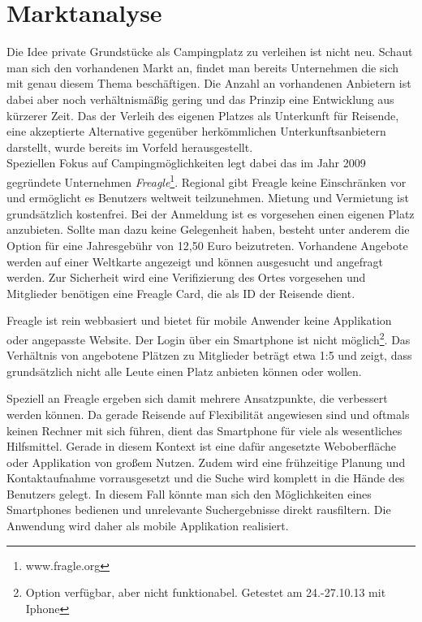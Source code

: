 
\section{Marktanalyse}
    Die Idee private Grundstücke als Campingplatz zu verleihen ist nicht neu. Schaut man sich den vorhandenen Markt an, findet man bereits Unternehmen die sich mit genau diesem Thema beschäftigen. Die Anzahl an vorhandenen Anbietern ist dabei aber noch verhältnismäßig gering und das Prinzip eine Entwicklung aus kürzerer Zeit. Das der Verleih des eigenen Platzes als Unterkunft für Reisende, eine akzeptierte Alternative gegenüber herkömmlichen Unterkunftsanbietern darstellt, wurde bereits im Vorfeld herausgestellt.\\
    Speziellen Fokus auf Campingmöglichkeiten legt dabei das im Jahr 2009 gegründete Unternehmen \textit{Freagle}\footnote{www.fragle.org}. Regional gibt Freagle keine Einschränken vor und ermöglicht es Benutzers weltweit teilzunehmen. Mietung und Vermietung ist grundsätzlich kostenfrei. Bei der Anmeldung ist es vorgesehen einen eigenen Platz anzubieten. Sollte man dazu keine Gelegenheit haben, besteht unter anderem die Option für eine Jahresgebühr von 12,50 Euro beizutreten. Vorhandene Angebote werden auf einer Weltkarte angezeigt und können ausgesucht und angefragt werden. Zur Sicherheit wird eine Verifizierung des Ortes vorgesehen und Mitglieder benötigen eine Freagle Card, die als ID der Reisende dient.

    Freagle ist rein webbasiert und bietet für mobile Anwender keine  Applikation oder angepasste Website. Der Login über ein Smartphone ist nicht möglich\footnote{Option verfügbar, aber nicht funktionabel. Getestet am 24.-27.10.13 mit Iphone}.
    Das Verhältnis von angebotene Plätzen zu Mitglieder beträgt etwa 1:5 und zeigt, dass grundsätzlich nicht alle Leute einen Platz anbieten können oder wollen.

    Speziell an Freagle ergeben sich damit mehrere Ansatzpunkte, die verbessert werden können. Da gerade Reisende auf Flexibilität angewiesen sind und oftmals keinen Rechner mit sich führen, dient das Smartphone für viele als wesentliches Hilfsmittel. Gerade in diesem Kontext ist eine dafür angesetzte Weboberfläche oder Applikation von großem Nutzen. Zudem wird eine frühzeitige Planung und Kontaktaufnahme vorrausgesetzt und die Suche wird komplett in die Hände des Benutzers gelegt. In diesem Fall könnte man sich den Möglichkeiten eines Smartphones bedienen und unrelevante Suchergebnisse direkt rausfiltern. Die Anwendung wird daher als mobile Applikation realisiert.

